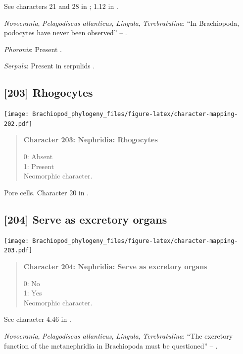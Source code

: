 \documentclass[openany]{book}
\begin{document}
See characters 21 and 28 in \citet{Haszprunar2000}; 1.12 in
\citet{Scheltema1993}.

\hypertarget{Lingula-coding-202}{}
\emph{Novocrania}, \emph{Pelagodiscus atlanticus}, \emph{Lingula},
\emph{Terebratulina}: ``In Brachiopoda, podocytes have never been
observed'' -- \citet{Luter1995}.

\hypertarget{Phoronis-coding-202}{}
\emph{Phoronis}: Present \citep{Storch1978}.

\hypertarget{Serpula-coding-202}{}
\emph{Serpula}: Present in serpulids \citep{Bartolomaeus2005}.

\subsection*{{[}203{]} Rhogocytes}\label{rhogocytes}

\texttt{[image: Brachiopod\_phylogeny\_files/figure-latex/character-mapping-202.pdf]}

\begin{quote}
\textbf{Character 203: Nephridia: Rhogocytes}

0: Absent\\
1: Present\\
Neomorphic character.
\end{quote}

Pore cells. Character 20 in \citet{Haszprunar2000}.

\subsection*{{[}204{]} Serve as excretory
organs}\label{serve-as-excretory-organs}

\texttt{[image: Brachiopod\_phylogeny\_files/figure-latex/character-mapping-203.pdf]}

\begin{quote}
\textbf{Character 204: Nephridia: Serve as excretory organs}

0: No\\
1: Yes\\
Neomorphic character.
\end{quote}

See character 4.46 in \citet{SPS1996}.

\hypertarget{Lingula-coding-204}{}
\emph{Novocrania}, \emph{Pelagodiscus atlanticus}, \emph{Lingula},
\emph{Terebratulina}: ``The excretory function of the metanephridia in
Brachiopoda must be questioned'' -- \citet{Luter1995}.
\end{document}
